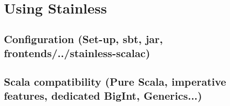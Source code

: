\chapter{Using Stainless}
\label{chap:using_stainless}

\section{Configuration (Set-up, sbt, jar, frontends/../stainless-scalac)}

\section{Scala compatibility (Pure Scala, imperative features, dedicated BigInt, Generics...)}

